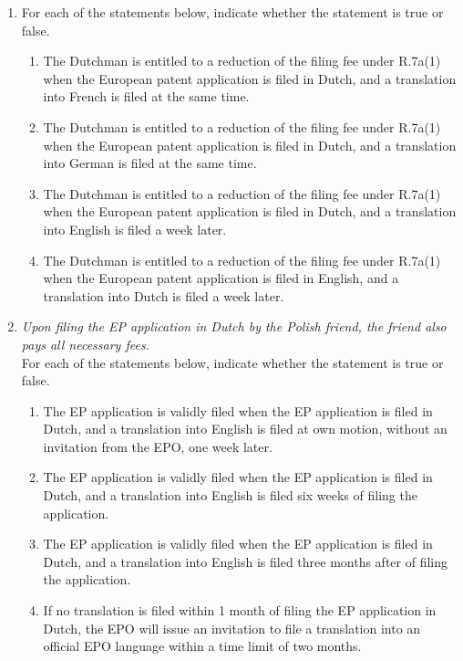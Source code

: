 \documentclass{report}
\begin{document}
\begin{enumerate}[label=\textbf{Question \arabic*}]
\begin{enumerate}[label=\textbf{Question \arabic*}]
\begin{enumerate}[label=(\alph*)]
        \item For each of the statements below, indicate whether the statement is true or false.
        \begin{enumerate}[label={(\alph{enumi}.\arabic*)}]
            \item The Dutchman is entitled to a reduction of the filing fee under R.7a(1) when the European patent application is filed in Dutch, and a translation into French is filed at the same time.
            \item The Dutchman is entitled to a reduction of the filing fee under R.7a(1) when the European patent application is filed in Dutch, and a translation into German is filed at the same time.
            \item The Dutchman is entitled to a reduction of the filing fee under R.7a(1) when the European patent application is filed in Dutch, and a translation into English is filed a week later.
            \item The Dutchman is entitled to a reduction of the filing fee under R.7a(1) when the European patent application is filed in English, and a translation into Dutch is filed a week later.
        \end{enumerate}
        
        \item \textit{Upon filing the EP application in Dutch by the Polish friend, the friend also pays all necessary fees.} \\
        For each of the statements below, indicate whether the statement is true or false.
        \begin{enumerate}[label={(\alph{enumi}.\arabic*)}]
            \item The EP application is validly filed when the EP application is filed in Dutch, and a translation into English is filed at own motion, without an invitation from the EPO, one week later.
            \item The EP application is validly filed when the EP application is filed in Dutch, and a translation into English is filed six weeks of filing the application.
            \item The EP application is validly filed when the EP application is filed in Dutch, and a translation into English is filed three months after of filing the application.
            \item If no translation is filed within 1 month of filing the EP application in Dutch, the EPO will issue an invitation to file a translation into an official EPO language within a time limit of two months.
        \end{enumerate}
    \end{enumerate}


\end{enumerate}
\end{enumerate}
\end{document}
